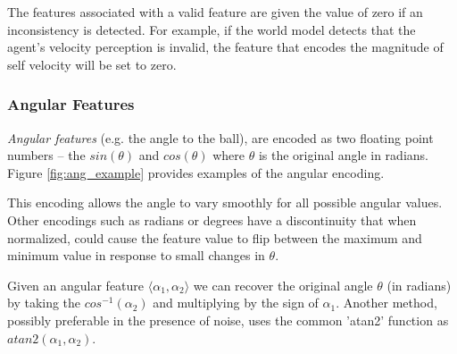 \documentclass[12pt]{article}
\begin{document}
The features associated with a valid feature are given the value of
zero if an inconsistency is detected. For example, if the world model
detects that the agent's velocity perception is invalid, the feature
that encodes the magnitude of self velocity will be set to zero.

\subsubsection{Angular Features}
\textit{Angular features} (e.g. the angle to the ball), are encoded as
two floating point numbers -- the $sin(\theta)$ and $cos(\theta)$
where $\theta$ is the original angle in radians. Figure
\ref{fig:ang_example} provides examples of the angular encoding.

This encoding allows the angle to vary smoothly for all possible
angular values. Other encodings such as radians or degrees have a
discontinuity that when normalized, could cause the feature value to
flip between the maximum and minimum value in response to small
changes in $\theta$.

Given an angular feature $\langle \alpha_1, \alpha_2 \rangle$ we can
recover the original angle $\theta$ (in radians) by taking the
$cos^{-1}(\alpha_2)$ and multiplying by the sign of $\alpha_1$.
Another method, possibly preferable in the presence of noise, uses
the common 'atan2' function as $atan2(\alpha_1, \alpha_2)$.

\begin{figure*}[htp]
  \centering
  \hspace{3em}
  \caption{\textbf{Angular Encoding:} Objects on the agents left/right
    side result in a negative/positive $sin(\theta)$. $cos(\theta)$ is
    positive in front of the player and negative behind. For example,
    an object directly in front of the player would have angular
    features of $sin(\theta)=0, cos(\theta)=1$. Additional examples:
    \textbf{Angle to ball} $\theta=60^\circ$ or $1.0472$ radians. This
    results in angular features $\langle sin(\theta)=.86,
    cos(\theta)=.49 \rangle$. \textbf{Angle to teammate}:
    $\theta=135^\circ, 2.35$ radians. $\langle sin(\theta)=.71,
    cos(\theta)=-.71 \rangle$. \textbf{Angle to Opponent}:
    $\theta=-90^\circ$ or $-1.57$ radians. $\langle sin(\theta)=-1,
    cos(\theta)=0 \rangle$.}
  \label{fig:ang_example}
\end{figure*}
\end{document}
